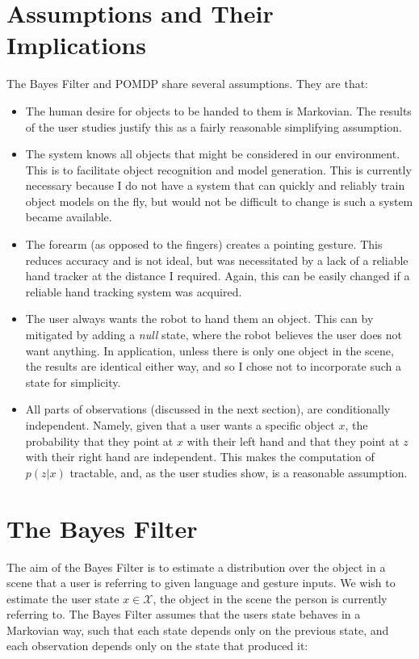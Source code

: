 \documentclass[a4paper, 11pt]{article} %
\begin{document}
\section{Assumptions and Their Implications}
The Bayes Filter and POMDP share several assumptions. They are that:
\begin{itemize}
\item The human desire for objects to be handed to them is Markovian. The results of the user studies justify this as a fairly reasonable simplifying assumption.
\item The system knows all objects that might be considered in our environment. This is to facilitate object recognition and model generation. This is currently necessary because I do not have a system that can quickly and reliably train object models on the fly, but would not be difficult to change is such a system became available.
\item The forearm (as opposed to the fingers) creates a pointing gesture. This reduces accuracy and is not ideal, but was necessitated by a lack of a reliable hand tracker at the distance I required. Again, this can be easily changed if a reliable hand tracking system was acquired.
\item The user always wants the robot to hand them an object. This can by mitigated by adding a \textit{null} state, where the robot believes the user does not want anything. In application, unless there is only one object in the scene, the results are identical either way, and so I chose not to incorporate such a state for simplicity.
\item All parts of observations (discussed in the next section), are conditionally independent. Namely, given that a user wants a specific object $x$, the probability that they point at $x$ with their left hand and that they point at $z$ with their right hand are independent. This makes the computation of $p(z|x)$ tractable, and, as the user studies show, is a reasonable assumption.
\end{itemize}
\section{The Bayes Filter}
The aim of the Bayes Filter is to estimate a distribution over the object in a scene that a user is referring to given language and gesture inputs. We wish to estimate the user state $x \in \mathcal{X}$, the object in the scene the person is currently referring to. The Bayes Filter assumes that the users state behaves in a  Markovian way, such that each state depends only on the previous state, and each observation depends only on the state that produced it:
\end{document}
